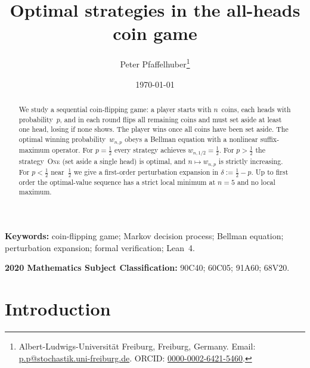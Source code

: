 \documentclass[12pt]{article}
\title{Optimal strategies in the all-heads coin game}
\author{Peter Pfaffelhuber\thanks{%
  Albert-Ludwigs-Universit\"at Freiburg, Freiburg, Germany.
  Email: \href{mailto:p.p@stochastik.uni-freiburg.de}{p.p@stochastik.uni-freiburg.de}.
  ORCID: \href{https://orcid.org/0000-0002-6421-5460}{0000-0002-6421-5460}.}}
\date{\today}
\theoremstyle{definition}
\theoremstyle{remark}
\newcommand{\One}{\textsc{One}}
\begin{document}
\maketitle

\begin{abstract}
  We study a sequential coin-flipping game: a player starts with
  $n$~coins, each heads with probability~$p$, and in each round flips
  all remaining coins and must set aside at least one head, losing if
  none shows.  The player wins once all coins have been set aside.
  The optimal winning probability~$w_{n,p}$ obeys a Bellman equation
  with a nonlinear suffix-maximum operator.  For $p=\tfrac12$ every
  strategy achieves $w_{n,1/2}=\tfrac12$.  For $p>\tfrac12$ the
  strategy~\One{} (set aside a single head) is optimal,
  and $n\mapsto w_{n,p}$ is strictly increasing.
  For $p<\tfrac12$ near~$\tfrac12$ we give a
  first-order perturbation expansion in $\delta:=\tfrac12-p$. Up to
  first order the optimal-value sequence has a strict local minimum at
  $n=5$ and no local maximum.
\end{abstract}

\noindent\textbf{Keywords:} coin-flipping game; Markov decision
process; Bellman equation; perturbation expansion; formal
verification; Lean~4.

\noindent\textbf{2020 Mathematics Subject Classification:}
90C40; 60C05; 91A60; 68V20.

\section{Introduction}\label{sec:intro}
\end{document}
